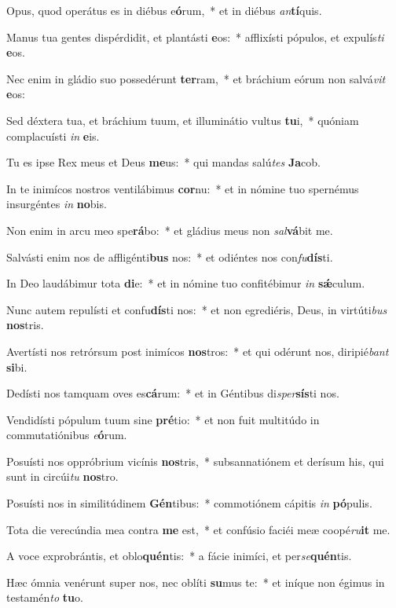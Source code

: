 \item Opus, quod operátus es in diébus e\textbf{ó}rum,~* et in diébus \textit{an}\textbf{tí}quis.
\item Manus tua gentes dispérdidit, et plantásti \textbf{e}os:~* afflixísti pópulos, et expulís\textit{ti} \textbf{e}os.
\item Nec enim in gládio suo possedérunt \textbf{ter}ram,~* et bráchium eórum non salvá\textit{vit} \textbf{e}os:
\item Sed déxtera tua, et bráchium tuum, et illuminátio vultus \textbf{tu}i,~* quóniam complacuísti \textit{in} \textbf{e}is.
\item Tu es ipse Rex meus et Deus \textbf{me}us:~* qui mandas salú\textit{tes} \textbf{Ja}cob.
\item In te inimícos nostros ventilábimus \textbf{cor}nu:~* et in nómine tuo spernémus insurgéntes \textit{in} \textbf{no}bis.
\item Non enim in arcu meo spe\textbf{rá}bo:~* et gládius meus non \textit{sal}\textbf{vá}bit me.
\item Salvásti enim nos de affligénti\textbf{bus} nos:~* et odiéntes nos con\textit{fu}\textbf{dís}ti.
\item In Deo laudábimur tota \textbf{di}e:~* et in nómine tuo confitébimur \textit{in} \textbf{sǽ}culum.
\item Nunc autem repulísti et confu\textbf{dís}ti nos:~* et non egrediéris, Deus, in virtúti\textit{bus} \textbf{nos}tris.
\item Avertísti nos retrórsum post inimícos \textbf{nos}tros:~* et qui odérunt nos, diripié\textit{bant} \textbf{si}bi.
\item Dedísti nos tamquam oves es\textbf{cá}rum:~* et in Géntibus di\textit{sper}\textbf{sís}ti nos.
\item Vendidísti pópulum tuum sine \textbf{pré}tio:~* et non fuit multitúdo in commutatiónibus \textit{e}\textbf{ó}rum.
\item Posuísti nos oppróbrium vicínis \textbf{nos}tris,~* subsannatiónem et derísum his, qui sunt in circúi\textit{tu} \textbf{nos}tro.
\item Posuísti nos in similitúdinem \textbf{Gén}tibus:~* commotiónem cápitis \textit{in} \textbf{pó}pulis.
\item Tota die verecúndia mea contra \textbf{me} est,~* et confúsio faciéi meæ coopé\textit{ru}\textbf{it} me.
\item A voce exprobrántis, et oblo\textbf{quén}tis:~* a fácie inimíci, et per\textit{se}\textbf{quén}tis.
\item Hæc ómnia venérunt super nos, nec oblíti \textbf{su}mus te:~* et iníque non égimus in testamén\textit{to} \textbf{tu}o.
